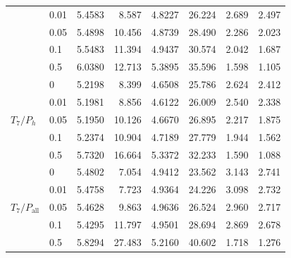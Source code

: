 \begin{table}[H]
\begin{tabular}{@{}llrrrrrr@{}}
 & 0.01 & 5.4583 & 8.587 & 4.8227 & 26.224 & 2.689 & 2.497 \\
 & 0.05 & 5.4898 & 10.456 & 4.8739 & 28.490 & 2.286 & 2.023 \\
 & 0.1 & 5.5483 & 11.394 & 4.9437 & 30.574 & 2.042 & 1.687 \\
 & 0.5 & 6.0380 & 12.713 & 5.3895 & 35.596 & 1.598 & 1.105 \\
\midrule
\multirow{5}{*}{$T_{7}/P_{h}$} & 0 & 5.2198 & 8.399 & 4.6508 & 25.786 & 2.624 & 2.412 \\
 & 0.01 & 5.1981 & 8.856 & 4.6122 & 26.009 & 2.540 & 2.338 \\
 & 0.05 & 5.1950 & 10.126 & 4.6670 & 26.895 & 2.217 & 1.875 \\
 & 0.1 & 5.2374 & 10.904 & 4.7189 & 27.779 & 1.944 & 1.562 \\
 & 0.5 & 5.7320 & 16.664 & 5.3372 & 32.233 & 1.590 & 1.088 \\
\midrule
\multirow{5}{*}{$T_{7}/P_{\mathrm{all}}$} & 0 & 5.4802 & 7.054 & 4.9412 & 23.562 & 3.143 & 2.741 \\
 & 0.01 & 5.4758 & 7.723 & 4.9364 & 24.226 & 3.098 & 2.732 \\
 & 0.05 & 5.4628 & 9.863 & 4.9636 & 26.524 & 2.960 & 2.717 \\
 & 0.1 & 5.4295 & 11.797 & 4.9501 & 28.694 & 2.869 & 2.678 \\
 & 0.5 & 5.8294 & 27.483 & 5.2160 & 40.602 & 1.718 & 1.276 \\
\bottomrule
\end{tabular}
\end{table}
